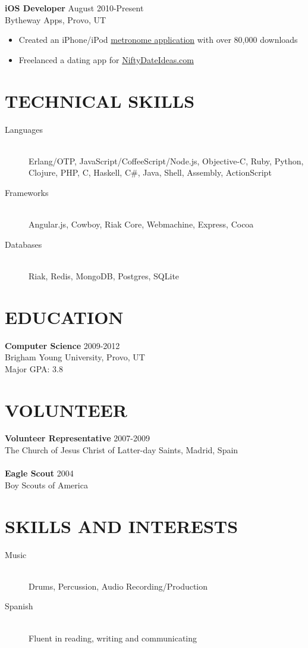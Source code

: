 \documentclass[margin]{res}
\begin{document}
\begin{resume}
      {\bf iOS Developer} \hfill  August 2010-Present \\
      Bytheway Apps, Provo, UT
      \begin{itemize} \itemsep -2pt
        \item Created an iPhone/iPod
        \href{http://itunes.apple.com/us/app/backbeat-pro-metronome/id415229485?mt=8}{metronome application}
        with over 80,000 downloads
        \item Freelanced a dating app for
        \href{http://itunes.apple.com/us/app/nifty-date-ideas/id425978808?mt=8}{NiftyDateIdeas.com}
      \end{itemize}

    \section{TECHNICAL SKILLS}
      \begin{description}
        \item[Languages] \hfill \\
        Erlang/OTP, JavaScript/CoffeeScript/Node.js, Objective-C, Ruby, Python, Clojure, PHP, C, Haskell, C\#, Java, Shell, Assembly, ActionScript
        \item[Frameworks] \hfill \\
        Angular.js, Cowboy, Riak Core, Webmachine, Express, Cocoa
        \item[Databases] \hfill \\
        Riak, Redis, MongoDB, Postgres, SQLite
      \end{description}

    \section{EDUCATION}
      {\bf Computer Science} \hfill 2009-2012 \\
      Brigham Young University, Provo, UT\\
      Major GPA: 3.8

    \section{VOLUNTEER}
      {\bf Volunteer Representative} \hfill 2007-2009 \\
      The Church of Jesus Christ of Latter-day Saints, Madrid, Spain \\ \\
      {\bf Eagle Scout} \hfill 2004 \\
      Boy Scouts of America

    \section{SKILLS AND INTERESTS}
      \begin{description}
        \item[Music] \hfill \\
        Drums, Percussion, Audio Recording/Production
        \item[Spanish] \hfill \\
        Fluent in reading, writing and communicating
      \end{description}
            
  \end{resume}
\end{document}
